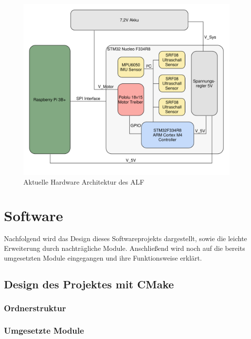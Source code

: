 \begin{figure}[hbtp]
\centering
\includegraphics[scale=0.5]{images/chapter5/HW-Architecture.pdf}
\caption{Aktuelle Hardware Architektur des ALF \label{fig:IfBoardHWUebersicht}}
\end{figure}















\chapter{Software}
Nachfolgend wird das Design dieses Softwareprojekts dargestellt, sowie die leichte Erweiterung durch nachträgliche Module. Anschließend wird noch auf die bereits umgesetzten Module eingegangen und ihre Funktionsweise erklärt. 

\section{Design des Projektes mit CMake}


\subsection{Ordnerstruktur}

\subsection{Umgesetzte Module}



